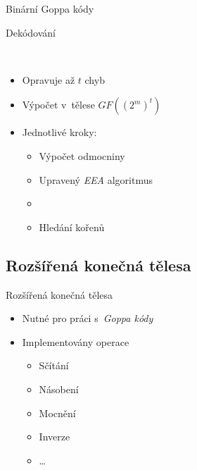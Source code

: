 \documentclass{beamer}
\begin{document}
\begin{frame}{Binární Goppa kódy}
    \begin{block}{Dekódování}

        ~\cite{Patterson}

        \begin{itemize}

            \item Opravuje až $t$ chyb
            \item Výpočet v~tělese $GF((2^m)^t)$
            \item Jednotlivé kroky:
                \begin{itemize}
                    \item Výpočet odmocniny
                    \item Upravený \emph{EEA} algoritmus
                    \item {}
                    \item \alert{Hledání kořenů}
                \end{itemize}

        \end{itemize}

    \end{block}
\end{frame}

\subsection{Rozšířená konečná tělesa}

\begin{frame}{Rozšířená konečná tělesa}
    \begin{itemize}

        \item Nutné pro práci s~\emph{Goppa kódy}

        \item Implementovány operace
            \begin{itemize}
                \item Sčítání
                \item Násobení
                \item Mocnění
                \item Inverze
                \item \ldots
            \end{itemize}

    \end{itemize}
\end{frame}
\end{document}

